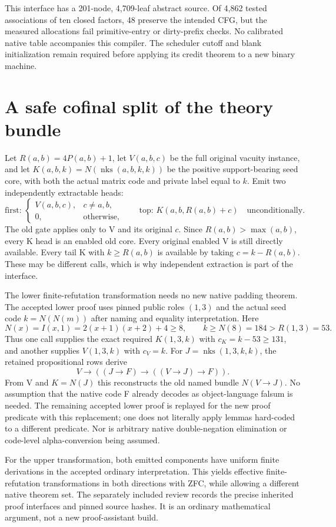 \documentclass[11pt]{article}
\begin{document}
This interface has a 201-node, 4,709-leaf abstract source. Of 4,862 tested associations of ten closed factors, 48 preserve the intended CFG, but the measured allocations fail primitive-entry or dirty-prefix checks. No calibrated native table accompanies this compiler. The scheduler cutoff and blank initialization remain required before applying its credit theorem to a new binary machine.

\section{A safe cofinal split of the theory bundle}
Let $R(a,b)=4P(a,b)+1$, let $V(a,b,c)$ be the full original vacuity instance, and let $K(a,b,k)=N(\operatorname{nks}(a,b,k,k))$ be the positive support-bearing seed core, with both the actual matrix code and private label equal to $k$. Emit two independently extractable heads:
\[
 \text{first: }\begin{cases}V(a,b,c),&c\ne a,b,\\0,&\text{otherwise},\end{cases}
 \qquad\text{top: }K(a,b,R(a,b)+c)\quad\text{unconditionally}.
\]
The old gate applies only to V and its original $c$. Since $R(a,b)>\max(a,b)$, every K head is an enabled old core. Every original enabled V is still directly available. Every tail K with $k\ge R(a,b)$ is available by taking $c=k-R(a,b)$. These may be different calls, which is why independent extraction is part of the interface.

The lower finite-refutation transformation needs no new native padding theorem. The accepted lower proof uses pinned public roles $(1,3)$ and the actual seed code $k=N(N(m))$ after naming and equality interpretation. Here
\[
 N(x)=I(x,1)=2(x+1)(x+2)+4\ge8,
 \qquad k\ge N(8)=184>R(1,3)=53.
\]
Thus one call supplies the exact required $K(1,3,k)$ with $c_K=k-53\ge131$, and another supplies $V(1,3,k)$ with $c_V=k$. For $J=\operatorname{nks}(1,3,k,k)$, the retained propositional rows derive
\[
 V\to((J\to F)\to((V\to J)\to F)).
\]
From V and $K=N(J)$ this reconstructs the old named bundle $N(V\to J)$. No assumption that the native code F already decodes as object-language falsum is needed. The remaining accepted lower proof is replayed for the new proof predicate with this replacement; one does not literally apply lemmas hard-coded to a different predicate. Nor is arbitrary native double-negation elimination or code-level alpha-conversion being assumed.

For the upper transformation, both emitted components have uniform finite derivations in the accepted ordinary interpretation. This yields effective finite-refutation transformations in both directions with ZFC, while allowing a different native theorem set. The separately included review records the precise inherited proof interfaces and pinned source hashes. It is an ordinary mathematical argument, not a new proof-assistant build.
\end{document}
